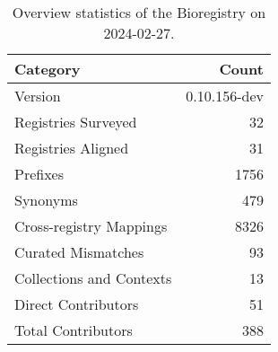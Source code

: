 \begin{table}
\caption{Overview statistics of the Bioregistry on 2024-02-27.}
\label{tab:bioregistry-summary}
\begin{tabular}{lr}
\toprule
Category & Count \\
\midrule
Version & 0.10.156-dev \\
Registries Surveyed & 32 \\
Registries Aligned & 31 \\
Prefixes & 1756 \\
Synonyms & 479 \\
Cross-registry Mappings & 8326 \\
Curated Mismatches & 93 \\
Collections and Contexts & 13 \\
Direct Contributors & 51 \\
Total Contributors & 388 \\
\bottomrule
\end{tabular}
\end{table}
